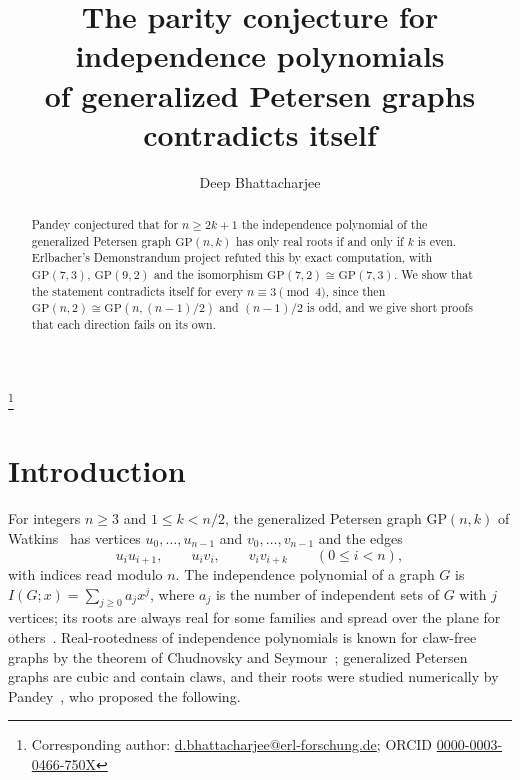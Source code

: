 \documentclass[11pt]{amsart}
\theoremstyle{definition}
\theoremstyle{remark}
\numberwithin{equation}{section}
\newcommand{\GP}{\mathrm{GP}}
\begin{document}
\title[Independence polynomials of generalized Petersen graphs]{The parity conjecture for independence polynomials\\ of generalized Petersen graphs contradicts itself}

\author{Deep Bhattacharjee}
\address{Formerly, Electro-Gravitational Space Propulsion Laboratory (EGSPL),\newline Bhubaneswar, Odisha 751030, India}
\thanks{Corresponding author: \href{mailto:d.bhattacharjee@erl-forschung.de}{d.bhattacharjee@erl-forschung.de}; ORCID \href{https://orcid.org/0000-0003-0466-750X}{\mbox{0000-0003-0466-750X}}}


\begin{abstract}
Pandey conjectured that for $n\ge 2k+1$ the independence polynomial of the generalized Petersen graph $\GP(n,k)$ has only real roots if and only if $k$ is even. Erlbacher's Demonstrandum project refuted this by exact computation, with $\GP(7,3)$, $\GP(9,2)$ and the isomorphism $\GP(7,2)\cong\GP(7,3)$. We show that the statement contradicts itself for every $n\equiv 3\pmod 4$, since then $\GP(n,2)\cong\GP(n,(n-1)/2)$ and $(n-1)/2$ is odd, and we give short proofs that each direction fails on its own.
\end{abstract}

\maketitle

\section{Introduction}

For integers $n\ge3$ and $1\le k<n/2$, the generalized Petersen graph $\GP(n,k)$ of Watkins~\cite{Watkins} has vertices $u_0,\dots,u_{n-1}$ and $v_0,\dots,v_{n-1}$ and the edges
\[
u_iu_{i+1},\qquad u_iv_i,\qquad v_iv_{i+k}\qquad(0\le i<n),
\]
with indices read modulo $n$. The independence polynomial of a graph $G$ is $I(G;x)=\sum_{j\ge0}a_jx^j$, where $a_j$ is the number of independent sets of $G$ with $j$ vertices; its roots are always real for some families and spread over the plane for others~\cite{BHN}. Real-rootedness of independence polynomials is known for claw-free graphs by the theorem of Chudnovsky and Seymour~\cite{CS}; generalized Petersen graphs are cubic and contain claws, and their roots were studied numerically by Pandey~\cite{Pandey}, who proposed the following.
\end{document}
